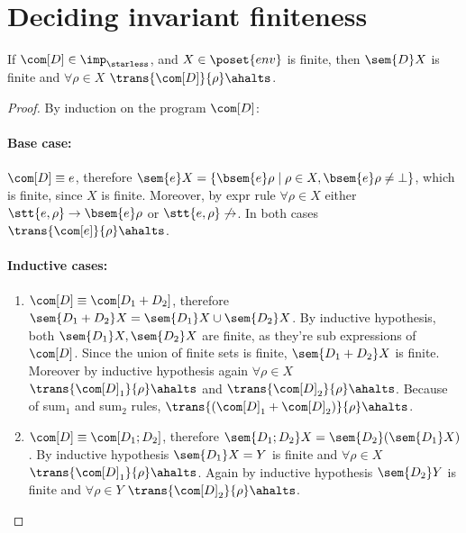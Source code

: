 \section{Deciding invariant finiteness}\label{sec:finiteness}

\begin{lemma}\label{le:finiteness}
  If \(\com[D]\in\imp_\starless\), and \(X \in \poset{env}\) is
  finite, then \(\sem{D}X\) is finite and \(\forall \rho \in X\)
  \(\trans{\com[D]}{\rho}\ahalts\).
\end{lemma}

\begin{proof}
  By induction on the program \(\com[D]\):
  \paragraph*{Base case:\\}
  \(\com[D] \equiv e\), therefore \(\sem{e}X = \{\bsem{e}\rho \mid
  \rho \in X , \bsem{e}\rho \neq \bot\}\), which is finite, since
  \(X\) is finite. Moreover, by expr rule \(\forall \rho \in X\)
  either \(\stt{e,\rho} \to \bsem{e}\rho\) or \(\stt{e,\rho}
  \not\to\). In both cases \(\trans{\com[e]}{\rho} \ahalts\).
  
  \paragraph*{Inductive cases:\\}
  \begin{enumerate}
  \item \(\com[D]\equiv \com[D_1 + D_2]\), therefore \(\sem{D_1 + D_2}
    X = \sem{D_1}X \cup \sem{D_2}X\). By inductive hypothesis, both
    \(\sem{D_1}X, \sem{D_2}X\) are finite, as they're sub expressions
    of \(\com[D]\). Since the union of finite sets is finite,
    \(\sem{D_1 + D_2}X\) is finite. Moreover by inductive hypothesis
    again \(\forall \rho \in X\) \(\trans{\com[D]_1}{\rho}\ahalts\)
    and \(\trans{\com[D]_2}{\rho}\ahalts\). Because of sum\(_1\) and
    sum\(_2\) rules, \(\trans{(\com[D]_1 + \com[D]_2)}{\rho}\ahalts\).
  \item \(\com[D]\equiv \com[D_1; D_2]\), therefore \(\sem{D_1;D_2}X =
    \sem{D_2}(\sem{D_1}X)\). By inductive hypothesis \(\sem{D_1}X =
    Y\) is finite and \(\forall \rho \in X\)
    \(\trans{\com[D]_1}{\rho}\ahalts\). Again by inductive hypothesis
    \(\sem{D_2}Y\) is finite and \(\forall \rho \in Y\)
    \(\trans{\com[D]_2}{\rho}\ahalts\).
  \end{enumerate}
\end{proof}

